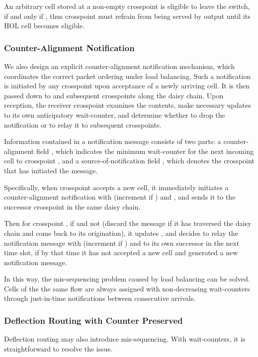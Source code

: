 \documentclass[journal,final,doublecolumn,10pt,twoside]{IEEEtranTCOM} \normalsize
\begin{document}
An arbitrary cell  stored at a non-empty crosspoint  is eligible to leave the switch, if and only if , thus crosspoint  must refrain from being served by output  until its HOL cell becomes eligible. 

\subsubsection{Counter-Alignment Notification}
\label{alignment}

We also design an explicit counter-alignment notification mechanism, which coordinates the correct packet ordering under load balancing. Such a notification is initiated by any crosspoint  upon acceptance of a newly arriving cell. It is then passed down to  and subsequent crosspoints along the daisy chain. Upon reception, the receiver crosspoint examines the contents, make necessary updates to its own anticipatory wait-counter, and determine whether to drop the notification or to relay it to subsequent crosspoints. 

Information contained in a notification message consists of two parts: a counter-alignment field , which indicates the minimum wait-counter for the next incoming cell to crosspoint , and a source-of-notification field , which denotes the crosspoint that has initiated the message.

Specifically, when crosspoint  accepts a new cell, it immediately initiates a counter-alignment notification with  (increment if ) and , and sends it to the successor crosspoint  in the same daisy chain.

Then for crosspoint , if  and not  (discard the message if it has traversed the daisy chain and come back to its origination), it updates , and decides to relay the notification message with  (increment if ) and  to its own successor  in the next time slot, if by that time it has not accepted a new cell and generated a new notification message.

In this way, the mis-sequencing problem caused by load balancing can be solved. Cells of the the same flow are always assigned with non-decreasing wait-counters through just-in-time notifications between consecutive arrivals.

\subsubsection{Deflection Routing with Counter Preserved}
\label{deflect}

Deflection routing may also introduce mis-sequencing. With wait-counters, it is straightforward to resolve the issue.
\end{document}
